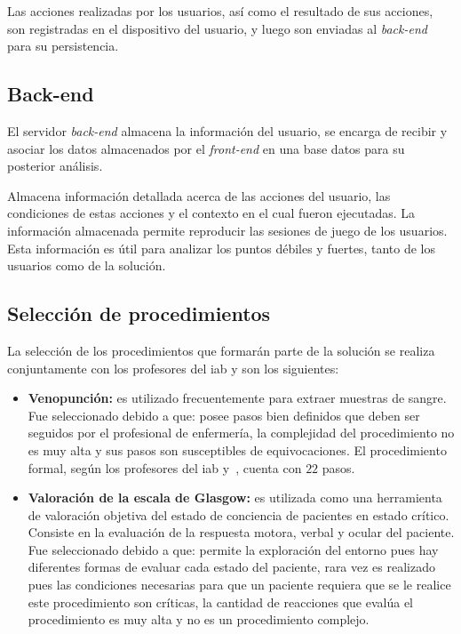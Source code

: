 Las acciones realizadas por los usuarios, así como el resultado de sus acciones,
son registradas en el dispositivo del usuario, y luego son enviadas al
\textit{back-end} para su persistencia.

\subsection{Back-end}

El servidor \textit{back-end} almacena la información del usuario, se encarga
de recibir y asociar los datos almacenados por el \textit{front-end} en una
base datos para su posterior análisis.


Almacena información detallada acerca de las acciones del usuario,
las condiciones de estas acciones y el contexto en el cual fueron ejecutadas.
La información almacenada permite reproducir las sesiones de juego
de los usuarios. Esta información es útil para analizar los puntos débiles y
fuertes, tanto de los usuarios como de la solución.

\subsection{Selección de procedimientos}

La selección de los procedimientos que formarán parte de la solución se realiza
conjuntamente con los profesores del \Gls{iab} y son los siguientes:

\begin{itemize}
\item \textbf{Venopunción:} es utilizado frecuentemente para extraer muestras de
    sangre. Fue seleccionado debido a que: posee pasos bien definidos que deben
    ser seguidos por el profesional de enfermería, la complejidad del
    procedimiento no es muy alta y sus pasos son susceptibles de equivocaciones.
    El procedimiento formal, según los profesores del \gls{iab}
    y~\cite{oms:extraccion}, cuenta con $22$ pasos.
\item \textbf{Valoración de la escala de Glasgow:} es utilizada como una
    herramienta de valoración objetiva del estado de conciencia de pacientes en
    estado crítico. Consiste en la evaluación de la respuesta motora, verbal y
    ocular del paciente\cite{protocolo}. Fue seleccionado debido a que: permite
    la exploración del entorno pues hay diferentes formas de evaluar cada estado
    del paciente, rara vez es realizado pues las condiciones necesarias para que
    un paciente requiera que se le realice este procedimiento son críticas, la
    cantidad de reacciones que evalúa el procedimiento es muy alta y no es un
    procedimiento complejo. 
\end{itemize}

